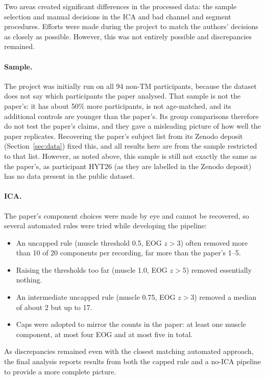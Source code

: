 \documentclass[10pt,a4paper]{article}
\begin{document}
Two areas created significant differences in the processed data: the sample selection and manual decisions 
in the ICA and bad channel and segment procedures. Efforts were made during the project
to match the authors' decisions as closely as possible. However, this was not entirely possible and
discrepancies remained.

\paragraph{Sample.} The project was initially run on all 94 non-TM participants, because the dataset does not say
which participants the paper analysed. That sample is not the paper's: it has about 50\% more participants, is
not age-matched, and its additional controls are younger than the paper's. Its group comparisons therefore do not
test the paper's claims, and they gave a misleading picture of how well the paper replicates. Recovering the
paper's subject list from its Zenodo deposit (Section~\ref{sec:data}) fixed this, and all results here are from
the sample restricted to that list. However, as noted above, this sample is still not exactly the same as the paper's, 
as participant HYT26 (as they are labelled in the Zenodo deposit) has no data present in the public dataset.

\paragraph{ICA.} The paper's component choices were made by eye and cannot be recovered, so several automated
rules were tried while developing the pipeline:
\begin{itemize}
  \item An uncapped rule (muscle threshold 0.5, EOG $z{>}3$) often removed more than 10 of 20 components per
        recording, far more than the paper's 1--5.
  \item Raising the thresholds too far (muscle 1.0, EOG $z{>}5$) removed essentially nothing.
  \item An intermediate uncapped rule (muscle 0.75, EOG $z{>}3$) removed a median of about 2 but up to 17.
  \item Caps were adopted to mirror the counts in the paper: at least one muscle component, at most four EOG and at
        most five in total.
\end{itemize}
As discrepancies remained even with the closest matching automated approach, the final analysis reports 
results from both the capped rule and a no-ICA pipeline to provide a more complete picture.
\end{document}
